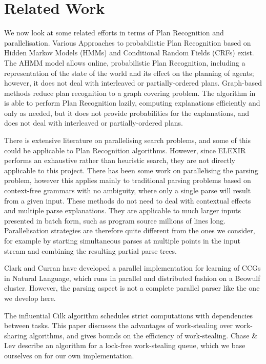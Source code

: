 \chapter{Related Work}

We now look at some related efforts in terms of Plan Recognition and parallelisation. Various Approaches to probabilistic Plan Recognition based on Hidden Markov Models (HMMs) and Conditional Random Fields (CRFs) exist. The AHMM model\cite{bib:hmm} allows online, probabilistic Plan Recognition, including a representation of the state of the world and its effect on the planning of agents; however, it does not deal with interleaved or partially-ordered plans.
Graph-based methods reduce plan recognition to a graph covering problem. The algorithm in \cite{bib:graph} is able to perform Plan Recognition lazily, computing explanations efficiently and only as needed, but it does not provide probabilities for the explanations, and does not deal with interleaved or partially-ordered plans.

There is extensive literature on parallelising search problems\cite{bib:search}, and some of this could be applicable to Plan Recognition algorithms. However, since ELEXIR performs an exhaustive rather than heuristic search, they are not directly applicable to this project. There has been some work on parallelising the parsing problem\cite{bib:parsing}, however this applies mainly to traditional parsing problems based on context-free grammars with no ambiguity, where only a single parse will result from a given input. These methods do not need to deal with contextual effects and multiple parse explanations. They are applicable to much larger inputs presented in batch form, such as program source millions of lines long. Parallelisation strategies are therefore quite different from the ones we consider, for example by starting simultaneous parses at multiple points in the input stream and combining the resulting partial parse trees.

Clark and Curran have developed a parallel implementation for learning of CCGs in Natural Language\cite{bib:ccgpar}, which runs in parallel and distributed fashion on a Beowulf cluster. However, the parsing aspect is not a complete parallel parser like the one we develop here.

The influential Cilk algorithm\cite{bib:workstealing} schedules strict computations with dependencies between tasks. This paper discusses the advantages of work-stealing over work-sharing algorithms, and gives bounds on the efficiency of work-stealing. Chase \& Lev describe an algorithm\cite{bib:queue} for a lock-free work-stealing queue, which we base ourselves on for our own implementation.
